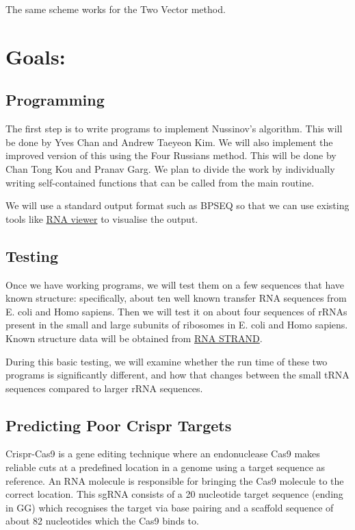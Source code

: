 \documentclass[11pt,a4paper]{article}
\begin{document}
The same scheme works for the Two Vector method.

\section{Goals:}
\subsection{Programming}

The first step is to write programs to implement Nussinov's algorithm. This will be done by Yves Chan and Andrew Taeyeon Kim. We will also implement the improved version of this using the Four Russians method. This will be done by Chan Tong Kou and Pranav Garg. We plan to divide the work by individually writing self-contained functions that can be called from the main routine.

We will use a standard output format such as BPSEQ so that we can use existing tools like \href{http://bioinfolab.miamioh.edu/rnasviewer2/index.php}{RNA viewer} to visualise the output.

\subsection{Testing}

Once we have working programs, we will test them on a few sequences that have known structure: specifically, about ten well known transfer RNA sequences from E. coli and Homo sapiens. Then we will test it on about four sequences of rRNAs present in the small and large subunits of ribosomes in E. coli and Homo sapiens. Known structure data will be obtained from \href{http://www.rnasoft.ca/strand/search.php}{RNA STRAND}.

During this basic testing, we will examine whether the run time of these two programs is significantly different, and how that changes between the small tRNA sequences compared to larger rRNA sequences.

\subsection{Predicting Poor Crispr Targets}
Crispr-Cas9 is a gene editing technique where an endonuclease Cas9 makes reliable cuts at a predefined location in a genome using a target sequence as reference. An RNA molecule is responsible for bringing the Cas9 molecule to the correct location. This sgRNA consists of a 20 nucleotide target sequence (ending in GG) which recognises the target via base pairing and a scaffold sequence of about 82 nucleotides which the Cas9 binds to.
\end{document}
